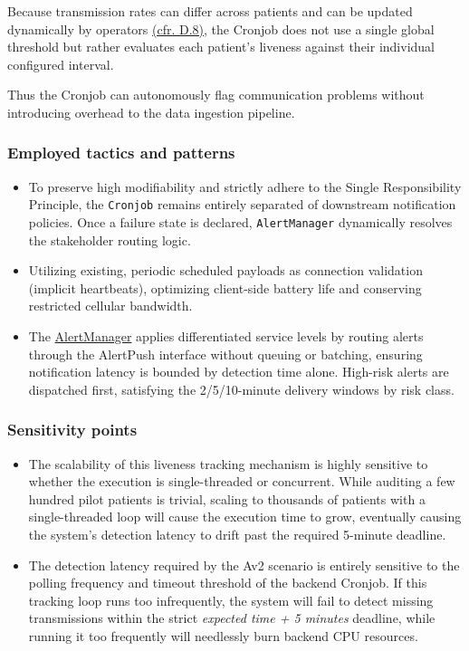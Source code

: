 Because transmission rates can differ across patients and can be updated dynamically by operators \hyperref[diag:Interaction:Updategatewaypushwaittime]{(cfr. D.8)}, the Cronjob does not use a single global threshold but rather evaluates each patient's liveness against their individual configured interval.

Thus the Cronjob can autonomously flag communication problems without introducing overhead to the data ingestion pipeline.

\subsubsection*{Employed tactics and patterns}
\begin{itemize}
	\item To preserve high modifiability and strictly adhere to the Single Responsibility Principle, the \texttt{Cronjob} remains entirely separated of downstream notification policies. Once a failure state is declared, \texttt{AlertManager} dynamically resolves the stakeholder routing logic.
	\item Utilizing existing, periodic scheduled payloads as connection validation (implicit heartbeats), optimizing client-side battery life and conserving restricted cellular bandwidth.
	\item The \hyperref[diag:Interaction:av2CommunicationchannelbetweenPMSandPGgoesdownDetectionbytimeoutBackend]{AlertManager} applies differentiated service levels by routing alerts through the AlertPush interface without queuing or batching, ensuring notification latency is bounded by detection time alone. High-risk alerts are dispatched first, satisfying the 2/5/10-minute delivery windows by risk class.
\end{itemize}

\subsubsection*{Sensitivity points}
\begin{itemize}
	\item The scalability of this liveness tracking mechanism is highly sensitive to whether the execution is single-threaded or concurrent. While auditing a few hundred pilot patients is trivial, scaling to thousands of patients with a single-threaded loop will cause the execution time to grow, eventually causing the system's detection latency to drift past the required 5-minute deadline.
	\item The detection latency required by the Av2 scenario is entirely sensitive to the polling frequency and timeout threshold of the backend Cronjob. If this tracking loop runs too infrequently, the system will fail to detect missing transmissions within the strict \textit{expected time + 5 minutes} deadline, while running it too frequently will needlessly burn backend CPU resources.
\end{itemize}

